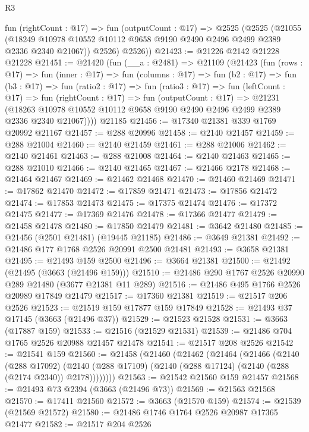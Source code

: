 \begin{lexlean}{R3}
\begin{coremodule}
      fun (rightCount : @17) =>
      fun (outputCount : @17) =>
      @2525
        (@2525
          (@21055
            (@18249 @10978 @10552 @10112 @9658 @9190 @2490 @2496 @2499 @2389 @2336 @2340 @21067))
          @2526)
        @2526))
@21423 := @21226 @2142 @21228 @21228
@21451 := @21420
    (fun (__a : @2481) =>
    @21109
      (@21423
        (fun (rows : @17) =>
        fun (inner : @17) =>
        fun (columns : @17) =>
        fun (b2 : @17) =>
        fun (b3 : @17) =>
        fun (ratio2 : @17) =>
        fun (ratio3 : @17) =>
        fun (leftCount : @17) =>
        fun (rightCount : @17) =>
        fun (outputCount : @17) =>
        @21231
          (@18263 @10978 @10552 @10112 @9658 @9190 @2490 @2496 @2499 @2389 @2336 @2340 @21067))))
    @21185
@21456 := @17340 @21381 @339 @1769 @20992 @21167
@21457 := @288 @20996
@21458 := @2140 @21457
@21459 := @288 @21004
@21460 := @2140 @21459
@21461 := @288 @21006
@21462 := @2140 @21461
@21463 := @288 @21008
@21464 := @2140 @21463
@21465 := @288 @21010
@21466 := @2140 @21465
@21467 := @21466 @2178
@21468 := @21464 @21467
@21469 := @21462 @21468
@21470 := @21460 @21469
@21471 := @17862 @21470
@21472 := @17859 @21471
@21473 := @17856 @21472
@21474 := @17853 @21473
@21475 := @17375 @21474
@21476 := @17372 @21475
@21477 := @17369 @21476
@21478 := @17366 @21477
@21479 := @21458 @21478
@21480 := @17850 @21479
@21481 := @3642 @21480
@21485 := @21456 (@2501 @21481) (@19445 @21185)
@21486 := @3649 @21381
@21492 := @21486 @177 @1768 @2526 @20991 @2500 @21481
@21493 := @3658 @21381
@21495 := @21493 @159 @2500
@21496 := @3664 @21381
@21500 := @21492 (@21495 (@3663 (@21496 @159)))
@21510 := @21486 @290 @1767 @2526 @20990 @289 @21480 (@3677 @21381 @11 @289)
@21516 := @21486 @495 @1766 @2526 @20989 @17849 @21479
@21517 := @17360 @21381
@21519 := @21517 @206 @2526
@21523 := @21519 @159 @17877 @159 @17849
@21528 := @21493 @37 @17145 (@3663 (@21496 @37))
@21529 := @21523 @21528
@21531 := @3663 (@17887 @159)
@21533 := @21516 (@21529 @21531)
@21539 := @21486 @704 @1765 @2526 @20988 @21457 @21478
@21541 := @21517 @208 @2526
@21542 := @21541 @159
@21560 := @21458
    (@21460
      (@21462
        (@21464
          (@21466
            (@2140
              (@288 @17092)
              (@2140 (@288 @17109) (@2140 (@288 @17124) (@2140 (@288 (@2174 @2340)) @2178))))))))
@21563 := @21542 @21560 @159 @21457
@21568 := @21493 @73 @2394 (@3663 (@21496 @73))
@21569 := @21563 @21568
@21570 := @17411 @21560
@21572 := @3663 (@21570 @159)
@21574 := @21539 (@21569 @21572)
@21580 := @21486 @1746 @1764 @2526 @20987 @17365 @21477
@21582 := @21517 @204 @2526

\end{coremodule}
\end{lexlean}
